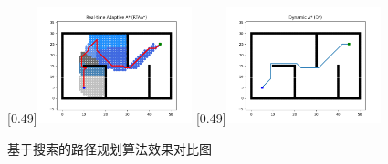 \documentclass[master,academic]{ysuthesis} %
\begin{document}
\begin{figure}[H]
			[0.49\textwidth]{\includegraphics[width=0.4\textwidth]{fig/插图/A-search/RTAAstar.png}}
			[0.49\textwidth]{\includegraphics[width=0.4\textwidth]{fig/插图/A-search/Dstar.png}}
			\caption{基于搜索的路径规划算法效果对比图}
			\label{fig:基于搜索的路径规划}
		\end{figure}
\end{document}
